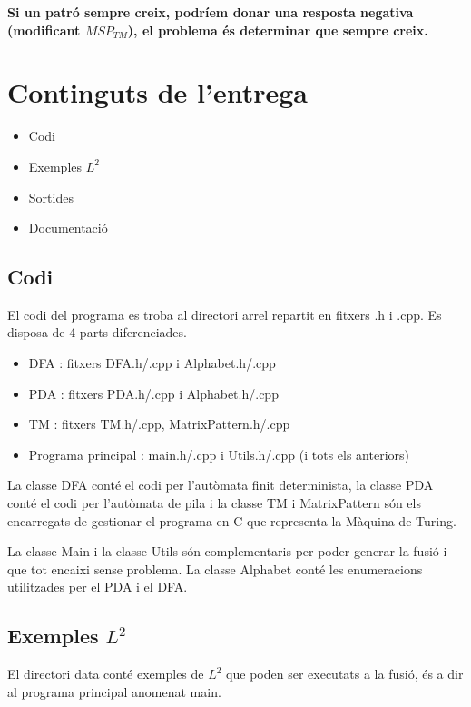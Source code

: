 \documentclass[12pt,a4paper]{report}
\def \tm{$MSP_{TM} $}
\begin{document}
\textbf{Si un patró sempre creix, podríem donar una resposta negativa (modificant \tm{}), el problema és determinar que sempre creix.}


\clearpage

\chapter{Continguts de l'entrega}

\begin{itemize}
\item Codi
\item Exemples $L^2$
\item Sortides
\item Documentació 
\end{itemize}

\section{Codi}

El codi del programa es troba al directori arrel repartit en fitxers .h i .cpp. Es disposa de 4 parts diferenciades. 

\begin{itemize}
\item DFA : fitxers DFA.h/.cpp i Alphabet.h/.cpp
\item PDA : fitxers PDA.h/.cpp i Alphabet.h/.cpp
\item TM : fitxers TM.h/.cpp, MatrixPattern.h/.cpp 
\item Programa principal : main.h/.cpp i Utils.h/.cpp (i tots els anteriors)
\end{itemize}

La classe DFA conté el codi per l'autòmata finit determinista, la classe PDA conté el codi per l'autòmata de pila i la classe TM i MatrixPattern són els encarregats de gestionar el programa en C que representa la Màquina de Turing. 

La classe Main i la classe Utils són complementaris per poder generar la fusió i que tot encaixi sense problema. La classe Alphabet conté les enumeracions utilitzades per el PDA i el DFA.

\section{Exemples $L^2$}

El directori data conté exemples de $L^2$ que poden ser executats a la fusió, és a dir al programa principal anomenat main.
\end{document}
